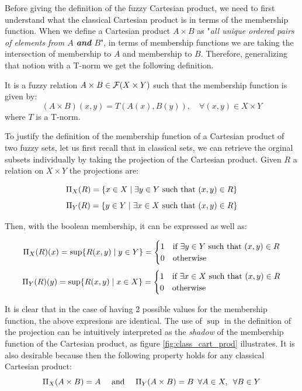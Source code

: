   Before giving the definition of the fuzzy Cartesian product, we need to first understand what the classical Cartesian product is in terms of the membership function. When we define a Cartesian product $A\times B$ as "\textit{all unique ordered pairs of elements from $A$ \textbf{and} $B$}", in terms of membership functions we are taking the intersection of membership to $A$ and membership to $B$. Therefore, generalizing that notion with a T-norm we get the following definition.

  \begin{definition}
    It is a fuzzy relation $A\times B \in \mathcal{F}(X\times Y)$ such that the membership function is given by:
    \[ 
    (A\times B)(x,y) = T(A(x), B(y)), \quad \forall (x,y) \in X\times Y
    \]
    where $T$ is a T-norm.
  \end{definition}

  To justify the definition of the membership function of a Cartesian product of two fuzzy sets, let us first recall that in classical sets, we can retrieve the orginal subsets individually by taking the projection of the Cartesian product. Given $R$ a relation on $X\times Y$ the projections are:

  \[\Pi_X(R)=\{x \in X \mid \exists y \in Y \textnormal{ such that } (x,y) \in R\}\]
  \[\Pi_Y(R)=\{y \in Y \mid \exists x \in X \textnormal{ such that } (x,y) \in R\}\]

  Then, with the boolean membership, it can be expressed as well as:

  \[\Pi_X(R)(x)=\sup\{R(x,y) \mid y\in Y\}=
  \begin{cases}
    1 & \textnormal{if } \exists y \in Y \textnormal{ such that } (x,y) \in R \\
    0 & \textnormal{otherwise}
  \end{cases}
  \]
  \[
    \Pi_Y(R)(y)=\sup\{R(x,y) \mid x\in X\}=
    \begin{cases}
      1 & \textnormal{if } \exists x \in X \textnormal{ such that } (x,y) \in R \\
      0 & \textnormal{otherwise}
    \end{cases}
  \]

  It is clear that in the case of having 2 possible values for the membership function, the above expresions are identical. The use of $\sup$ in the definition of the projection can be intuitively interpreted as the \textit{shadow} of the membership function of the Cartesian product, as figure \ref{fig:class_cart_prod} illustrates. It is also desirable because then the following property holds for any classical Cartesian product:\\
  $$ 
  \Pi_X(A\times B)=A \quad \textnormal{ and } \quad \Pi_Y(A\times B)=B \forall A\in X, \forall B \in Y
  $$

